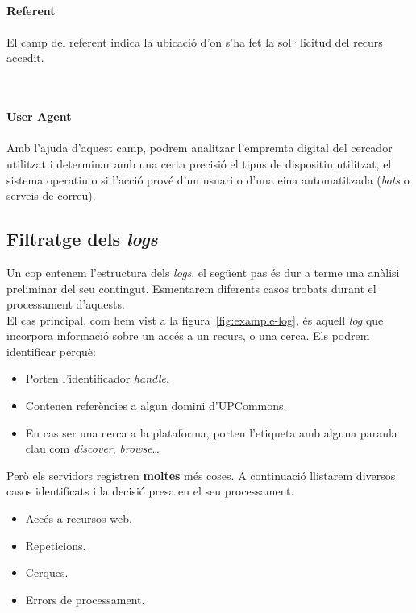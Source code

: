 \noindent \\
\textbf{Referent} \\ \\
El camp del referent indica la ubicació d’on s’ha fet la sol·licitud del recurs accedit.

\noindent \\ \\
\textbf{User Agent} \\ \\
Amb l’ajuda d’aquest camp, podrem analitzar l’empremta digital del cercador utilitzat i determinar amb una certa precisió el tipus de dispositiu utilitzat, el sistema operatiu o si l’acció prové d’un usuari o d’una eina automatitzada (\textit{bots} o serveis de correu).

\clearpage

\subsection{Filtratge dels \textit{\gls{log}s}}\label{subsec:log-filter}

Un cop entenem l'estructura dels \textit{logs}, el següent pas és dur a terme una anàlisi preliminar del seu contingut.
Esmentarem diferents casos trobats durant el processament d'aquests. \\

\noindent
El cas principal, com hem vist a la figura~\ref{fig:example-log}, és aquell \textit{\gls{log}} que incorpora informació sobre un accés a un recurs, o una cerca.
Els podrem identificar perquè:

\begin{itemize}
    \item Porten l’identificador \textit{\gls{handle}}.
    \item Contenen referències a algun domini d’\gls{UPCommons}.
    \item En cas ser una cerca a la plataforma, porten l’etiqueta amb alguna paraula clau com \textit{discover}, \textit{browse}\dots
\end{itemize}

\noindent
Però els servidors registren \textbf{moltes} més coses.
A continuació llistarem diversos casos identificats i la decisió presa en el seu processament.

\begin{itemize}
    \item Accés a recursos web.
    \item Repeticions.
    \item Cerques.
    \item Errors de processament.
\end{itemize}

